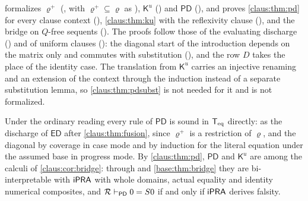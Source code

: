 \begin{remark}
\label{claus:rem:pdlean}
 formalizes $\varrho^{+}$ (, with
$\varrho^{+}\subseteq\varrho$ as ), $\mathsf{K}^{u}$
() and $\mathsf{PD}$ (), and proves
\cref{claus:thm:pd} for every clause context (),
\cref{claus:thm:ku} with the reflexivity clause (),
and the bridge on $Q$-free sequents ().
The proofs follow those of the evaluating discharge () and of
uniform clauses (): the diagonal start of the introduction
depends on the matrix only and commutes with substitution
(), and the row $D$ takes the place of the identity
case.  The translation from $\mathsf{K}^{u}$ carries an injective renaming
and an extension of the context through the induction instead of a
separate substitution lemma, so \cref{claus:thm:pdsubst} is not needed
for it and is not formalized.
\end{remark}

Under the ordinary reading every rule of $\mathsf{PD}$ is sound in $\mathsf{T}_{\mathrm{eq}}$
directly:  as the discharge of $\mathsf{ED}$ after
\cref{claus:thm:fusion}, since $\varrho^{+}$ is a restriction of $\varrho$,
and the diagonal  by coverage in case mode and by induction
for the literal equation under the assumed base in progress mode. By
\cref{claus:thm:pd}, $\mathsf{PD}$ and $\mathsf{K}^{u}$ are among the
calculi of \cref{claus:cor:bridge}: through 
and \cref{base:thm:bridge} they are bi-interpretable with $\mathsf{iPRA}$ with
whole domains, actual equality and identity numerical composites, and
$\mathcal{R}\vdash_{\mathsf{PD}}0=S 0$ if and only if $\mathsf{iPRA}$ derives
falsity.


